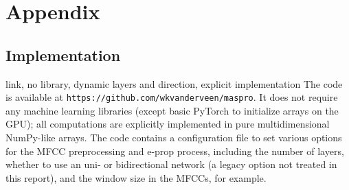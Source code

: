 \chapter{Appendix}\label{ch:appendix}

\section{Implementation}
link, no library, dynamic layers and direction, explicit implementation
The code is available at \texttt{https://github.com/wkvanderveen/maspro}.
It does not require any machine learning libraries (except basic PyTorch to initialize arrays on the GPU); all computations are explicitly implemented in pure multidimensional NumPy-like arrays.
The code contains a configuration file to set various options for the MFCC preprocessing and e-prop process, including the number of layers, whether to use an uni- or bidirectional network (a legacy option not treated in this report), and the window size in the MFCCs, for example.


